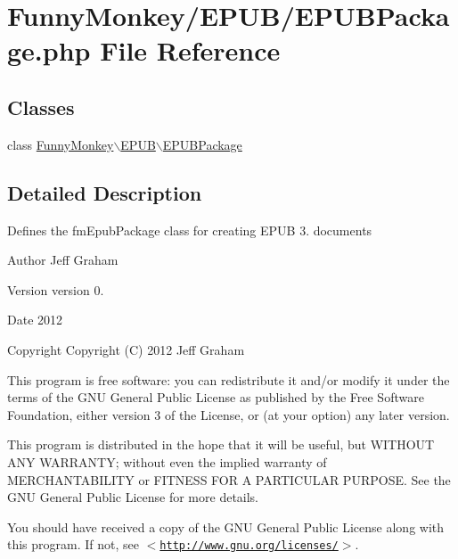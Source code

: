 \hypertarget{EPUBPackage_8php}{\section{\-Funny\-Monkey/\-E\-P\-U\-B/\-E\-P\-U\-B\-Package.php \-File \-Reference}
\label{EPUBPackage_8php}
}
\subsection*{\-Classes}
\begin{DoxyCompactItemize}
\item 
class \hyperlink{classFunnyMonkey_1_1EPUB_1_1EPUBPackage}{\-Funny\-Monkey$\backslash$\-E\-P\-U\-B$\backslash$\-E\-P\-U\-B\-Package}
\end{DoxyCompactItemize}


\subsection{\-Detailed \-Description}
\-Defines the fm\-Epub\-Package class for creating \-E\-P\-U\-B 3. documents

\begin{DoxyAuthor}{\-Author}
\-Jeff \-Graham 
\end{DoxyAuthor}
\begin{DoxyVersion}{\-Version}
version 0. 
\end{DoxyVersion}
\begin{DoxyDate}{\-Date}
2012 
\end{DoxyDate}
\begin{DoxyCopyright}{\-Copyright}
\-Copyright (\-C) 2012 \-Jeff \-Graham
\end{DoxyCopyright}
\-This program is free software\-: you can redistribute it and/or modify it under the terms of the \-G\-N\-U \-General \-Public \-License as published by the \-Free \-Software \-Foundation, either version 3 of the \-License, or (at your option) any later version.

\-This program is distributed in the hope that it will be useful, but \-W\-I\-T\-H\-O\-U\-T \-A\-N\-Y \-W\-A\-R\-R\-A\-N\-T\-Y; without even the implied warranty of \-M\-E\-R\-C\-H\-A\-N\-T\-A\-B\-I\-L\-I\-T\-Y or \-F\-I\-T\-N\-E\-S\-S \-F\-O\-R \-A \-P\-A\-R\-T\-I\-C\-U\-L\-A\-R \-P\-U\-R\-P\-O\-S\-E. \-See the \-G\-N\-U \-General \-Public \-License for more details.

\-You should have received a copy of the \-G\-N\-U \-General \-Public \-License along with this program. \-If not, see $<$\href{http://www.gnu.org/licenses/}{\tt http\-://www.\-gnu.\-org/licenses/}$>$.

